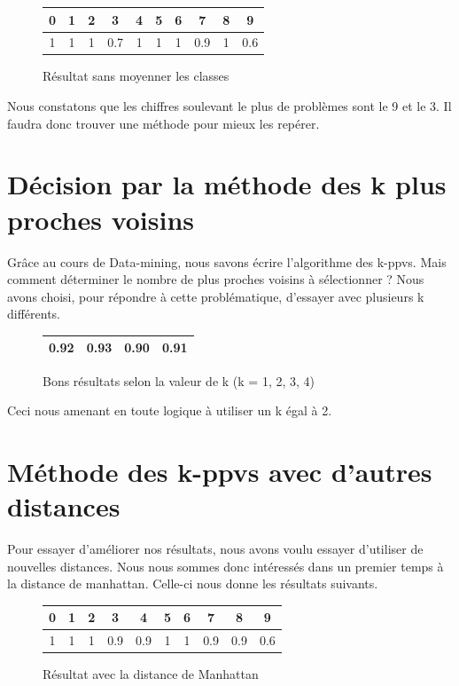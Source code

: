 \begin{figure}[h!]
\centering
\begin{tabular}{|*{10}{c|}}
    \hline
    0 & 1 & 2 & 3 & 4 & 5 & 6 & 7 & 8 & 9 \\
    \hline
    1 & 1 & 1 & 0.7 & 1 & 1 & 1 & 0.9 & 1 & 0.6  \\
    \hline
\end{tabular}
\caption{Résultat sans moyenner les classes}
\end{figure} 

Nous constatons que les chiffres soulevant le plus de problèmes sont 
le 9 et le 3. Il faudra donc trouver une méthode pour mieux les repérer.

\section{Décision par la méthode des k plus proches voisins}

Grâce au cours de Data-mining, nous savons écrire l'algorithme des k-ppvs.
Mais comment déterminer le nombre de plus proches voisins à sélectionner ?
Nous avons choisi, pour répondre à cette problématique, d'essayer 
avec plusieurs k différents. 

\begin{figure}[h!]
\centering
\begin{tabular}{|*{4}{c|}}
    \hline
    0.92 & 0.93 & 0.90 & 0.91 \\
    \hline
\end{tabular}
\caption{Bons résultats selon la valeur de k (k = 1, 2, 3, 4)}
\end{figure} 

Ceci nous amenant en toute logique à utiliser un k égal à 2.

\section{Méthode des k-ppvs avec d'autres distances}

Pour essayer d'améliorer nos résultats, nous avons voulu essayer
d'utiliser de nouvelles distances. Nous nous sommes donc intéressés
dans un premier temps à la distance de manhattan. Celle-ci nous donne 
les résultats suivants.

\begin{figure}[h!]
\centering
\begin{tabular}{|*{10}{c|}}
    \hline
    0 & 1 & 2 & 3 & 4 & 5 & 6 & 7 & 8 & 9 \\
    \hline
    1 & 1 & 1 & 0.9 & 0.9 & 1 & 1 & 0.9 & 0.9 & 0.6  \\
    \hline
\end{tabular}
\caption{Résultat avec la distance de Manhattan}
\end{figure} 

